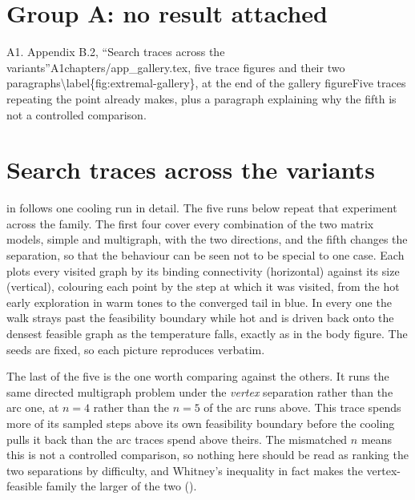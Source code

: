 \clearpage

\section*{Group A: no result attached}

\begin{offcut}{A1. Appendix B.2, ``Search traces across the variants''}{A1}{chapters/app\_gallery.tex, five trace figures and their two paragraphs}{\textbackslash{}label\{fig:extremal-gallery\}, at the end of the gallery figure}{Five traces repeating the point  already makes, plus a paragraph explaining why the fifth is not a controlled comparison.}
\section{Search traces across the variants}\label{app:traces}

 in  follows one cooling run in detail. The five runs below repeat that experiment across the family. The first four cover every combination of the two matrix models, simple and multigraph, with the two directions, and the fifth changes the separation, so that the behaviour can be seen not to be special to one case. Each plots every visited graph by its binding connectivity (horizontal) against its size (vertical), colouring each point by the step at which it was visited, from the hot early exploration in warm tones to the converged tail in blue. In every one the walk strays past the feasibility boundary while hot and is driven back onto the densest feasible graph as the temperature falls, exactly as in the body figure. The seeds are fixed, so each picture reproduces verbatim.

The last of the five is the one worth comparing against the others. It runs the same directed multigraph problem under the \emph{vertex} separation rather than the arc one, at $n = 4$ rather than the $n = 5$ of the arc runs above. This trace spends more of its sampled steps above its own feasibility boundary before the cooling pulls it back than the arc traces spend above theirs. The mismatched $n$ means this is not a controlled comparison, so nothing here should be read as ranking the two separations by difficulty, and Whitney's inequality in fact makes the vertex-feasible family the larger of the two ().


\end{offcut}
